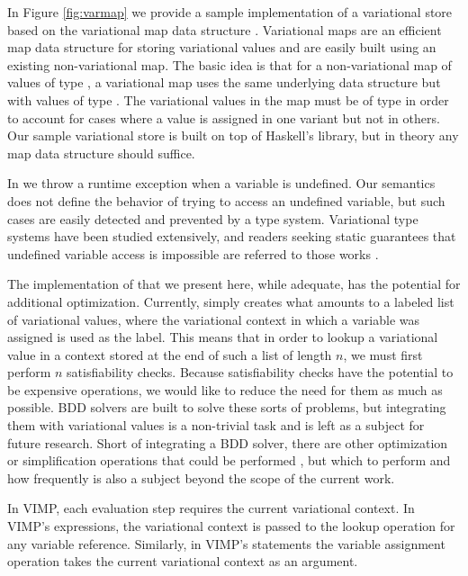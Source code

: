 \documentclass[12pt,oneside]{book}
\begin{document}
In Figure \ref{fig:varmap} we provide a sample implementation of a variational store based on the variational map data structure \cite{varwhile, Walk14onward}.
Variational maps are an efficient map data structure for storing variational values and are easily built using an existing non-variational map. The basic idea
is that for a non-variational map of values of type , a variational map uses the same underlying data structure but with values of type .
The variational values in the map must be of type  in order to account for cases where a value is assigned in one variant but not in others. Our sample
variational store is built on top of Haskell's  library, but in theory any map data structure should suffice.

In  we throw a runtime exception when a variable is undefined. Our semantics does not define the behavior of trying to access an undefined variable, but
such cases are easily detected and prevented by a type system. Variational type systems have been studied extensively, and readers seeking static guarantees
that undefined variable access is impossible are referred to those works \cite{kenner2010typechef,CEW12icfp,CEW14toplas}.

The implementation of  that we present here, while adequate, has the potential for additional optimization. Currently,  simply creates what amounts to a labeled list of variational values, where the variational context in which a variable was assigned is used as the label.
This means that in order to lookup a variational value in a context stored at the end of such a list of length $n$, we must first perform $n$ satisfiability checks.
Because satisfiability checks have the potential to be expensive operations, we would like to reduce the need for them as much as possible.
BDD solvers are built to solve these sorts of problems, but integrating them with variational values is a non-trivial task and is left as a subject for future research.
Short of integrating a BDD solver, there are other optimization or simplification operations that could be performed \cite{Walk13thesis,HW16fosd}, but which to perform and how frequently
is also a subject beyond the scope of the current work.

In VIMP, each evaluation step requires the current variational context. In VIMP's expressions, the variational context is passed to the lookup operation for any
variable reference. Similarly, in VIMP's statements the variable assignment operation takes the current variational context as an argument.
\end{document}
